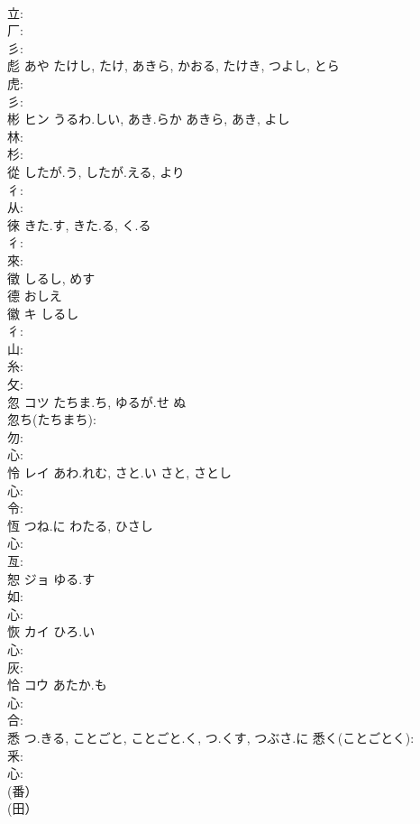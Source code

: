 \documentclass[8pt]{extreport}
\begin{document}
\begin{CJK}{UTF8}{min}
\\	立: 
\\	厂: 
\\	彡: 
\\	彪		あや	たけし, たけ, あきら, かおる, たけき, つよし, とら			
\\	虎: 
\\	彡: 
\\	彬	ヒン	うるわ.しい, あき.らか	あきら, あき, よし	
\\	林: 
\\	杉: 
\\	從		したが.う, したが.える, より				
\\	彳: 
\\	从: 
\\	徠		きた.す, きた.る, く.る				
\\	彳: 
\\	來: 
\\	徵		しるし, めす				
\\	德		おしえ				
\\	徽	キ	しるし		
\\	彳: 
\\	山: 
\\	糸: 
\\	攵: 
\\	忽	コツ	たちま.ち, ゆるが.せ	ぬ	
\\	忽ち(たちまち): 
\\	勿: 
\\	心: 
\\	怜	レイ	あわ.れむ, さと.い	さと, さとし	
\\	心: 
\\	令: 
\\	恆		つね.に	わたる, ひさし			
\\	心: 
\\	亙: 
\\	恕	ジョ	ゆる.す		
\\	如: 
\\	心: 
\\	恢	カイ	ひろ.い		
\\	心: 
\\	灰: 
\\	恰	コウ	あたか.も		
\\	心: 
\\	合: 
\\	悉		つ.きる, ことごと, ことごと.く, つ.くす, つぶさ.に			悉く(ことごとく): 
\\	釆: 
\\	心: 
\\	(番）
\\	(田） 

\end{CJK}
\end{document}
